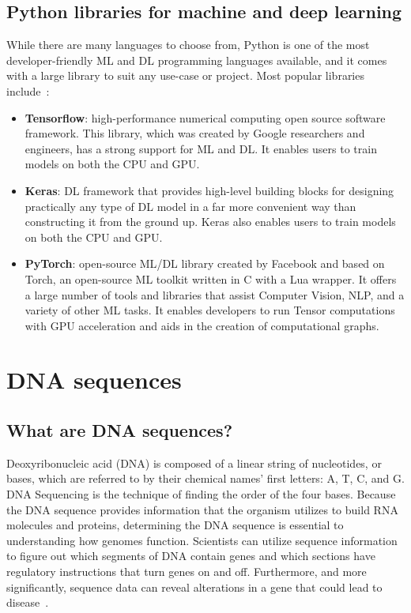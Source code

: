\subsection{Python libraries for machine and deep learning}

While there are many languages to choose from, Python is one of the most developer-friendly \gls{ML} and \gls{DL} programming languages available, and it comes with a large library to suit any use-case or project. Most popular libraries include~\cite{JonssonWaysDevelopment,BestGeeksforGeeks}:

\begin{itemize}
    \item \textbf{Tensorflow}: high-performance numerical computing open source software framework. This library, which was created by Google researchers and engineers, has a strong support for \gls{ML} and \gls{DL}.  It enables users to train models on both the CPU and GPU.
    \item \textbf{Keras}: \gls{DL} framework that provides high-level building blocks for designing practically any type of \gls{DL} model in a far more convenient way than constructing it from the ground up. Keras also enables users to train models on both the CPU and GPU.
    \item \textbf{PyTorch}: open-source \gls{ML}/\gls{DL} library created by Facebook and based on Torch, an open-source \gls{ML} toolkit written in C with a Lua wrapper. It offers a large number of tools and libraries that assist Computer Vision, \gls{NLP}, and a variety of other \gls{ML} tasks. It enables developers to run Tensor computations with GPU acceleration and aids in the creation of computational graphs.
\end{itemize}

\section{DNA sequences} \label{sec:dna_sequences}

\subsection{What are DNA sequences?}

Deoxyribonucleic acid (DNA) is composed of a linear string of nucleotides, or bases, which are referred to by their chemical names' first letters: A, T, C, and G. DNA Sequencing is the technique of finding the order of the four bases. Because the DNA sequence provides information that the organism utilizes to build RNA molecules and proteins, determining the DNA sequence is essential to understanding how genomes function. Scientists can utilize sequence information to figure out which segments of DNA contain genes and which sections have regulatory instructions that turn genes on and off. Furthermore, and more significantly, sequence data can reveal alterations in a gene that could lead to disease~\cite{2020DNASheet}.

